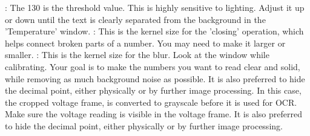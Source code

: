 {}\markdownRendererUlBeginTight
\markdownRendererUlItem {} \markdownRendererUlItemEnd 
\markdownRendererUlEndTight \markdownRendererInterblockSeparator
{}\markdownRendererSectionBegin
\markdownRendererSectionBegin
{}\markdownRendererInterblockSeparator
{}\markdownRendererUlBegin
\markdownRendererUlItem {}: The 130 is the threshold value. This is highly sensitive to lighting. Adjust it up or down until the text is clearly separated from the background in the 'Temperature' window.\markdownRendererUlItemEnd 
\markdownRendererUlItem {}: This is the kernel size for the 'closing' operation, which helps connect broken parts of a number. You may need to make it larger or smaller.\markdownRendererUlItemEnd 
\markdownRendererUlItem {}: This is the kernel size for the blur.\markdownRendererUlItemEnd 
\markdownRendererUlEnd \markdownRendererInterblockSeparator
{}Look at the  window while calibrating. Your goal is to make the numbers you want to read clear and solid, while removing as much background noise as possible.\markdownRendererInterblockSeparator
{}It is also preferred to hide the decimal point, either physically or by further image processing.\markdownRendererInterblockSeparator
{}\markdownRendererUlBeginTight
\markdownRendererUlItem {} In this case, the cropped voltage frame, is converted to grayscale before it is used for OCR. Make sure the voltage reading is visible in the voltage frame. It is also preferred to hide the decimal point, either physically or by further image processing.\markdownRendererInterblockSeparator
